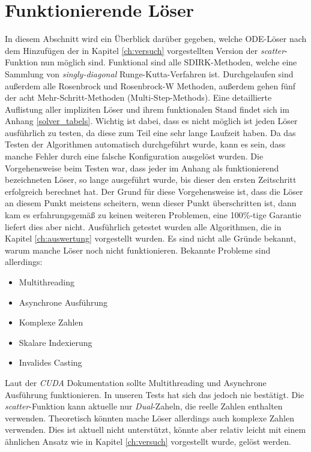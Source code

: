 \section{Funktionierende Löser}

In diesem Abschnitt wird ein Überblick darüber gegeben, welche 
ODE-Löser nach dem Hinzufügen der in Kapitel \ref{ch:versuch} vorgestellten 
Version der \textit{scatter}-Funktion nun möglich sind.
Funktional sind alle SDIRK-Methoden, welche eine Sammlung von
\textit{singly-diagonal} Runge-Kutta-Verfahren \cite{sdirk} ist.
Durchgelaufen sind außerdem alle Rosenbrock und Rosenbrock-W Methoden,
außerdem gehen fünf der acht Mehr-Schritt-Methoden (Multi-Step-Methods).
Eine detaillierte Auflistung aller impliziten Löser und ihrem 
funktionalen Stand findet sich im Anhang \ref{solver_tabels}.
Wichtig ist dabei, dass es nicht möglich ist jeden Löser ausführlich zu testen,
da diese zum Teil eine sehr lange Laufzeit haben.
Da das Testen der Algorithmen automatisch durchgeführt wurde,
kann es sein, dass manche Fehler durch eine falsche Konfiguration ausgelöst wurden.
Die Vorgehensweise beim Testen war, dass jeder im Anhang als funktionierend 
bezeichneten Löser, so lange ausgeführt wurde, bis dieser den ersten Zeitschritt erfolgreich berechnet hat.
Der Grund für diese Vorgehensweise ist, dass die Löser an diesem Punkt meistens scheitern,
wenn dieser Punkt überschritten ist, dann kam es erfahrungsgemäß zu keinen 
weiteren Problemen, eine 100\%-tige Garantie liefert dies aber nicht.
Ausführlich getestet wurden alle Algorithmen, die in Kapitel \ref{ch:auswertung} vorgestellt wurden.
Es sind nicht alle Gründe bekannt, warum manche Löser noch nicht funktionieren.
Bekannte Probleme sind allerdings:

\begin{itemize}
    \item Multithreading
    \item Asynchrone Ausführung
    \item Komplexe Zahlen
    \item Skalare Indexierung
    \item Invalides Casting
\end{itemize}

Laut der \textit{CUDA} Dokumentation sollte Multithreading und Asynchrone Ausführung funktionieren.
In unseren Tests hat sich das jedoch nie bestätigt.
Die \textit{scatter}-Funktion kann aktuelle nur \textit{Dual}-Zaheln, die reelle Zahlen enthalten verwenden. Theoretisch könnten mache Löser allerdings auch komplexe Zahlen verwenden.
Dies ist aktuell nicht unterstützt,
könnte aber relativ leicht mit einem ähnlichen Ansatz wie in Kapitel \ref{ch:versuch} vorgestellt wurde, gelöst werden.





